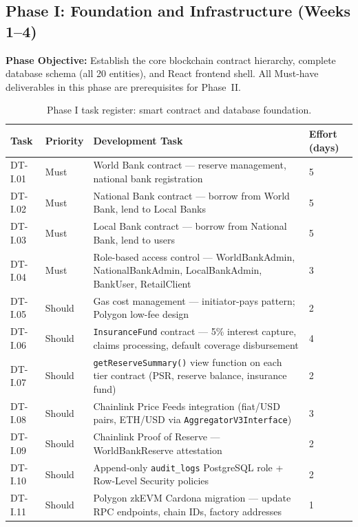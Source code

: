 \documentclass[12pt,a4paper]{report}
\newcommand{\tableheadcolor}{\rowcolor{TableHeadBg}}
\begin{document}
\subsection{Phase I: Foundation and Infrastructure (Weeks 1--4)}

\textbf{Phase Objective:} Establish the core blockchain contract hierarchy,
complete database schema (all 20 entities), and React frontend shell.
All Must-have deliverables in this phase are prerequisites for Phase~II.

\begin{table}[H]
\centering
\caption[Phase I task register]{Phase I task register: smart contract and database foundation.%
\footnotemark}
\label{tab:phaseI-contracts}
\small
\begin{tabular}{p{1.8cm}p{1.8cm}p{7.5cm}p{1.5cm}}
\toprule
\tableheadcolor
\textbf{Task} & \textbf{Priority} & \textbf{Development Task} & \textbf{Effort (days)} \\
\midrule
DT-I.01 & Must & World Bank contract --- reserve management, national bank registration & 5 \\
DT-I.02 & Must & National Bank contract --- borrow from World Bank, lend to Local Banks & 5 \\
DT-I.03 & Must & Local Bank contract --- borrow from National Bank, lend to users & 5 \\
DT-I.04 & Must & Role-based access control --- WorldBankAdmin, NationalBankAdmin, LocalBankAdmin, BankUser, RetailClient & 3 \\
DT-I.05 & Should & Gas cost management --- initiator-pays pattern; Polygon low-fee design & 2 \\
DT-I.06 & Should & \texttt{InsuranceFund} contract --- 5\% interest capture, claims processing, default coverage disbursement & 4 \\
DT-I.07 & Should & \texttt{getReserveSummary()} view function on each tier contract (PSR, reserve balance, insurance fund) & 2 \\
DT-I.08 & Should & Chainlink Price Feeds integration (fiat/USD pairs, ETH/USD via \texttt{AggregatorV3Interface}) & 3 \\
DT-I.09 & Should & Chainlink Proof of Reserve --- WorldBankReserve attestation & 2 \\
DT-I.10 & Should & Append-only \texttt{audit\_logs} PostgreSQL role + Row-Level Security policies & 2 \\
DT-I.11 & Should & Polygon zkEVM Cardona migration --- update RPC endpoints, chain IDs, factory addresses & 1 \\

\end{tabular}
\end{table}
\end{document}
